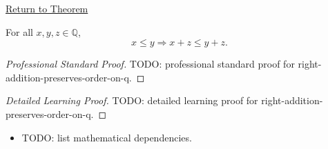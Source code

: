 \newpage
{}
\label{prf:right-addition-preserves-order-on-q}

\begin{remark*}[Return]
\hyperref[cor:right-addition-preserves-order-on-q]{Return to Theorem}
\end{remark*}

\begin{corollary*}
For all $x,y,z\in\mathbb{Q}$,
\[
x\le y \Longrightarrow x+z\le y+z.
\]
\end{corollary*}

\begin{proof}[Professional Standard Proof]
\LRAProofBodyStart
TODO: professional standard proof for right-addition-preserves-order-on-q.
\end{proof}

\begin{proof}[Detailed Learning Proof]
\LRAProofBodyStart
TODO: detailed learning proof for right-addition-preserves-order-on-q.
\end{proof}

\begin{remark*}
\end{remark*}

\begin{dependencies}
\begin{itemize}
  \item TODO: list mathematical dependencies.
\end{itemize}
\end{dependencies}

\clearpage
